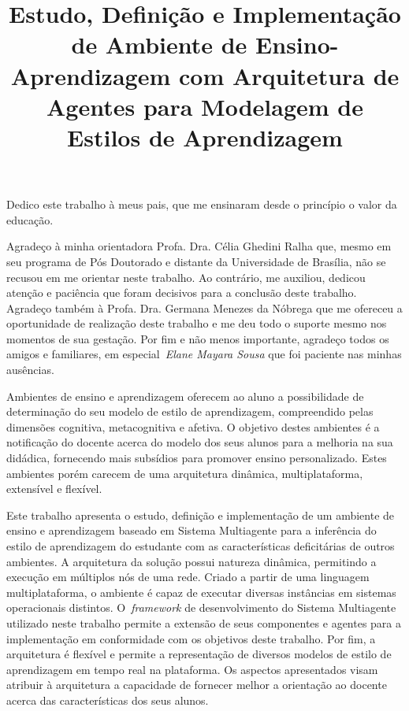 \documentclass[bacharelado]{unb-cic}
\title{Estudo, Definição e Implementação de Ambiente de Ensino-Aprendizagem com Arquitetura de Agentes para Modelagem de Estilos de Aprendizagem}
\begin{document}
  \maketitle

  \begin{dedicatoria}
  Dedico este trabalho à meus pais, que me ensinaram desde o princípio o valor da educação.
  \end{dedicatoria}

  \begin{agradecimentos}
  Agradeço à minha orientadora Profa. Dra. Célia Ghedini Ralha que, mesmo em seu programa de Pós Doutorado e distante da Universidade de Brasília, não se recusou em me orientar neste trabalho. Ao contrário, me auxiliou, dedicou atenção e paciência que foram decisivos para a conclusão deste trabalho.
  Agradeço também à Profa. Dra. Germana Menezes da Nóbrega que me ofereceu a oportunidade de realização deste trabalho e me deu todo o suporte mesmo nos momentos de sua gestação.
  Por fim e não menos importante, agradeço todos os amigos e familiares, em especial~\emph{Elane Mayara Sousa} que foi paciente nas minhas ausências.
  \end{agradecimentos}

  \begin{resumo}
  Ambientes de ensino e aprendizagem oferecem ao aluno a possibilidade de determinação do seu modelo de estilo de aprendizagem, compreendido pelas dimensões cognitiva, metacognitiva e afetiva. O objetivo destes ambientes é a notificação do docente acerca do modelo dos seus alunos para a melhoria na sua didádica, fornecendo mais subsídios para promover ensino personalizado. Estes ambientes porém carecem de uma arquitetura dinâmica, multiplataforma, extensível e flexível. 

  Este trabalho apresenta o estudo, definição e implementação de um ambiente de ensino e aprendizagem baseado em Sistema Multiagente para a inferência do estilo de aprendizagem do estudante com as características deficitárias de outros ambientes. A arquitetura da solução possui natureza dinâmica, permitindo a execução em múltiplos nós de uma rede. Criado a partir de uma linguagem multiplataforma, o ambiente é capaz de executar diversas instâncias em sistemas operacionais distintos. O~\emph{framework} de desenvolvimento do Sistema Multiagente utilizado neste trabalho permite a extensão de seus componentes e agentes para a implementação em conformidade com os objetivos deste trabalho. Por fim, a arquitetura é flexível e permite a representação de diversos modelos de estilo de aprendizagem em tempo real na plataforma. Os aspectos apresentados visam atribuir à arquitetura a capacidade de fornecer melhor a orientação ao docente acerca das características dos seus alunos.
  \end{resumo}
\end{document}
